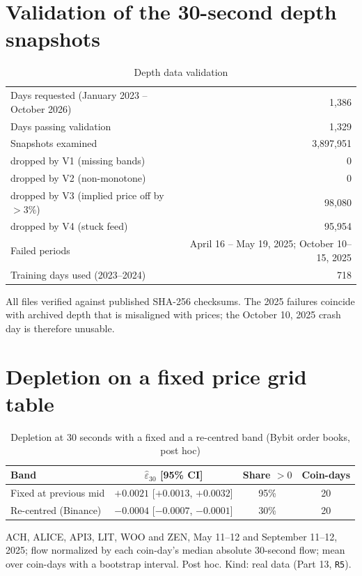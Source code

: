 \documentclass[12pt]{article}
\theoremstyle{definition}
\theoremstyle{remark}
\begin{document}
\section{Validation of the 30-second depth snapshots}
\FloatBarrier
\begin{table}[t]\centering\small
\begin{threeparttable}
\caption{Depth data validation}\label{tab:d2}
\begin{tabular}{lr}
\toprule
Days requested (January 2023 -- October 2026) & 1{,}386\\
Days passing validation & 1{,}329\\
Snapshots examined & 3{,}897{,}951\\
\quad dropped by V1 (missing bands) & 0\\
\quad dropped by V2 (non-monotone) & 0\\
\quad dropped by V3 (implied price off by $>3\%$) & 98{,}080\\
\quad dropped by V4 (stuck feed) & 95{,}954\\
Failed periods & April 16 -- May 19, 2025; October 10--15, 2025\\
Training days used (2023--2024) & 718\\
\bottomrule
\end{tabular}
\begin{tablenotes}\footnotesize\item All files verified against published SHA-256 checksums. The 2025 failures coincide with archived depth that is misaligned with prices; the October 10, 2025 crash day is therefore unusable. \end{tablenotes}
\end{threeparttable}
\end{table}
\FloatBarrier
\section{Depletion on a fixed price grid table}
\FloatBarrier
\begin{table}[t]\centering\small
\begin{threeparttable}
\caption{Depletion at 30 seconds with a fixed and a re-centred band (Bybit order books, post hoc)}\label{tab:fixedgrid}
\begin{tabular}{lccc}
\toprule
Band & $\hat\varepsilon_{30}$ [95\% CI] & Share $>0$ & Coin-days\\
\midrule
Fixed at previous mid & $+0.0021$ [$+0.0013$, $+0.0032$] & 95\% & 20\\
Re-centred (Binance) & $-0.0004$ [$-0.0007$, $-0.0001$] & 30\% & 20\\
\bottomrule
\end{tabular}
\begin{tablenotes}\footnotesize\item ACH, ALICE, API3, LIT, WOO and ZEN, May 11--12 and September 11--12, 2025; flow normalized by each coin-day's median absolute 30-second flow; mean over coin-days with a bootstrap interval. Post hoc. Kind: real data (Part 13, \texttt{R5}).\end{tablenotes}
\end{threeparttable}
\end{table}
\FloatBarrier
\end{document}
